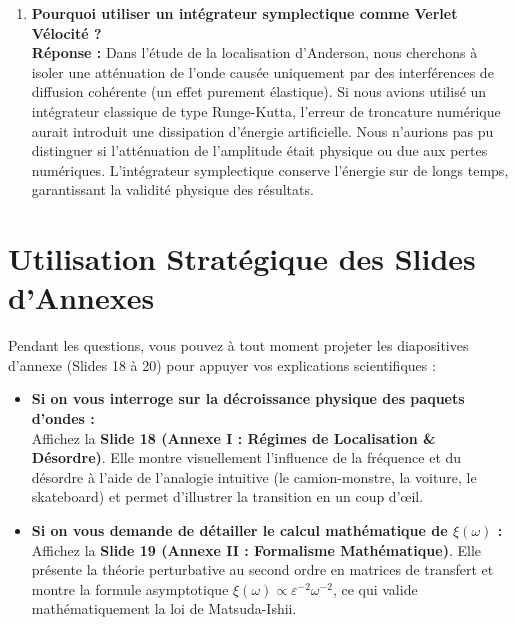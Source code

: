 \documentclass[11pt,a4paper]{article}
\begin{document}
\begin{tcolorbox}[colback=blue!5,colframe=blue!75!black,title=Slide 2 : Table des Matières --- 0:45 à 1:15]
\begin{enumerate}[label=\textbf{Q\arabic* :}]
    \item \textbf{Pourquoi utiliser un intégrateur symplectique comme Verlet Vélocité ?} \\
    \textbf{Réponse :} \og  Dans l'étude de la localisation d'Anderson, nous cherchons à isoler une atténuation de l'onde causée uniquement par des interférences de diffusion cohérente (un effet purement élastique). Si nous avions utilisé un intégrateur classique de type Runge-Kutta, l'erreur de troncature numérique aurait introduit une dissipation d'énergie artificielle. Nous n'aurions pas pu distinguer si l'atténuation de l'amplitude était physique ou due aux pertes numériques. L'intégrateur symplectique conserve l'énergie sur de longs temps, garantissant la validité physique des résultats. \fg{}
\end{enumerate}

\newpage

\section{Utilisation Stratégique des Slides d'Annexes}
Pendant les questions, vous pouvez à tout moment projeter les diapositives d'annexe (Slides 18 à 20) pour appuyer vos explications scientifiques :

\begin{itemize}[label=\textbullet]
    \item \textbf{Si on vous interroge sur la décroissance physique des paquets d'ondes :} \\
    Affichez la \textbf{Slide 18 (Annexe I : Régimes de Localisation \& Désordre)}. Elle montre visuellement l'influence de la fréquence et du désordre à l'aide de l'analogie intuitive (le camion-monstre, la voiture, le skateboard) et permet d'illustrer la transition en un coup d'œil.
    
    \item \textbf{Si on vous demande de détailler le calcul mathématique de $\xi(\omega)$ :} \\
    Affichez la \textbf{Slide 19 (Annexe II : Formalisme Mathématique)}. Elle présente la théorie perturbative au second ordre en matrices de transfert et montre la formule asymptotique $\xi(\omega) \propto \varepsilon^{-2} \omega^{-2}$, ce qui valide mathématiquement la loi de Matsuda-Ishii.
    

\end{itemize}
\end{tcolorbox}
\end{document}
